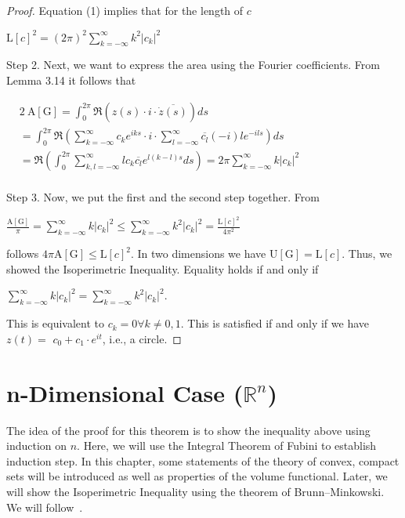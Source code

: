 \documentclass[a4paper]{book}
\numberwithin{theorem}{section}%
\begin{document}
\begin{proof}
    Equation (1) implies that for the length of $c$
    \begin{center}
        $\displaystyle \mathrm{L}[c]^2=(2 \pi)^2 \sum_{k=-\infty}^{\infty} k^2\left|c_k\right|^2$
    \end{center}

    Step 2. Next, we want to express the area using the Fourier coefficients. From Lemma 3.14 it follows that
    \begin{center}
        $\displaystyle \begin{aligned}&2\mathrm{~A}[\mathrm{G}]=\int_0^{2 \pi} \Re(z(s) \cdot i \cdot \overline{\dot{z}(s)}) d s \\&=\int_0^{2 \pi} \Re\left(\sum_{k=-\infty}^{\infty} c_k e^{i k s} \cdot i \cdot \sum_{l=-\infty}^{\infty} \overline{c_l}(-i) l e^{-i l s}\right) d s \\& =\Re\left(\int_0^{2 \pi} \sum_{k, l=-\infty}^{\infty} l c_k \overline{c_l} e^{l(k-l) s} d s\right)=2 \pi \sum_{k=-\infty}^{\infty} k\left|c_k\right|^2 \\&\end{aligned}$
    \end{center}

    Step 3. Now, we put the first and the second step together. From
    \begin{center}
        $\displaystyle \frac{\mathrm{A}[\mathrm{G}]}{\pi}=\sum_{k=-\infty}^{\infty} k\left|c_k\right|^2 \leq \sum_{k=-\infty}^{\infty} k^2\left|c_k\right|^2=\frac{\mathrm{L}[c]^2}{4 \pi^2}$
    \end{center}

    follows $4 \pi \mathrm{A}[\mathrm{G}] \leq \mathrm{L}[c]^2$. In two dimensions we have $\mathrm{U}[\mathrm{G}]=\mathrm{L}[c]$. Thus, we showed the Isoperimetric Inequality. Equality holds if and only if
    \begin{center}
        $\displaystyle \sum_{k=-\infty}^{\infty} k\left|c_k\right|^2=\sum_{k=-\infty}^{\infty} k^2\left|c_k\right|^2 .$
    \end{center}

    This is equivalent to $c_k=0 \forall k \neq 0,1$. This is satisfied if and only if we have $z(t)=$ $c_0+c_1 \cdot e^{i t}$, i.e., a circle.
\end{proof}

\chapter{n-Dimensional Case ($\mathbb{R}^n$)}
The idea of the proof for this theorem is to show the inequality above using induction on $n$. Here, we will use the Integral Theorem of Fubini to establish induction step. In this chapter, some statements of the theory of convex, compact sets will be introduced as well as properties of the volume functional. Later, we will show the Isoperimetric Inequality using the theorem of Brunn–Minkowski. We will follow~\citep{schneider2014convex}.
\end{document}
